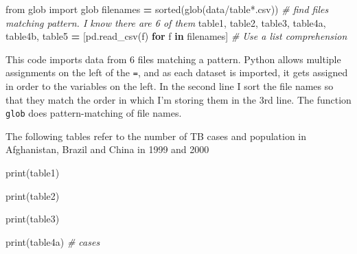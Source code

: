 \documentclass[
  letterpaper,
]{scrbook}
\newenvironment{Shaded}{\begin{snugshade}}{\end{snugshade}}
\newcommand{\BuiltInTok}[1]{#1}
\newcommand{\CommentTok}[1]{\textcolor[rgb]{0.56,0.35,0.01}{\textit{#1}}}
\newcommand{\ControlFlowTok}[1]{\textcolor[rgb]{0.13,0.29,0.53}{\textbf{#1}}}
\newcommand{\ImportTok}[1]{#1}
\newcommand{\KeywordTok}[1]{\textcolor[rgb]{0.13,0.29,0.53}{\textbf{#1}}}
\newcommand{\NormalTok}[1]{#1}
\newcommand{\OperatorTok}[1]{\textcolor[rgb]{0.81,0.36,0.00}{\textbf{#1}}}
\newcommand{\StringTok}[1]{\textcolor[rgb]{0.31,0.60,0.02}{#1}}
\begin{document}
\begin{Shaded}
\begin{Highlighting}[]
\ImportTok{from}\NormalTok{ glob }\ImportTok{import}\NormalTok{ glob}
\NormalTok{filenames }\OperatorTok{=} \BuiltInTok{sorted}\NormalTok{(glob(}\StringTok{\textquotesingle{}data/table*.csv\textquotesingle{}}\NormalTok{)) }\CommentTok{\# find files matching pattern. I know there are 6 of them}
\NormalTok{table1, table2, table3, table4a, table4b, table5 }\OperatorTok{=}\NormalTok{ [pd.read\_csv(f) }\ControlFlowTok{for}\NormalTok{ f }\KeywordTok{in}\NormalTok{ filenames] }\CommentTok{\# Use a list comprehension}
\end{Highlighting}
\end{Shaded}

This code imports data from 6 files matching a pattern. Python allows multiple assignments on the left of the \texttt{=}, and as each dataset is imported, it gets assigned in order to the variables on the left. In the second line I sort the file names so that they match the order in which I'm storing them in the 3rd line. The function \texttt{glob} does pattern-matching of file names.

The following tables refer to the number of TB cases and population in Afghanistan, Brazil and China in 1999 and 2000

\begin{Shaded}
\begin{Highlighting}[]
\BuiltInTok{print}\NormalTok{(table1)}
\end{Highlighting}
\end{Shaded}

\begin{Shaded}
\begin{Highlighting}[]
\BuiltInTok{print}\NormalTok{(table2)}
\end{Highlighting}
\end{Shaded}

\begin{Shaded}
\begin{Highlighting}[]
\BuiltInTok{print}\NormalTok{(table3)}
\end{Highlighting}
\end{Shaded}

\begin{Shaded}
\begin{Highlighting}[]
\BuiltInTok{print}\NormalTok{(table4a) }\CommentTok{\# cases}
\end{Highlighting}
\end{Shaded}
\end{document}
